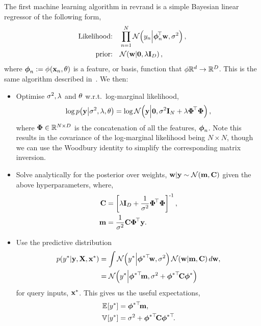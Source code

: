 \documentclass[11pt, oneside]{article}
\begin{document}
The first machine learning algorithm in revrand is a simple Bayesian linear
regressor of the following form,
\begin{align}
    \text{Likelihood:} \quad &\prod^N_{n=1} 
    \gausC{\targs_n}{\feats_n\T\weights, \var}, \\
    \text{prior:} \quad &\gausC{\weights}{\mathbf{0}, \reg\ident{D}},
\end{align}
where $\feats_n := \func{\featsym}{\inss_n, \param}{}$ is a feature, or basis,
function that $\featsym \real{d} \to \real{D}$. This is the same algorithm
described in~\cite[Chapter 2]{Rasmussen2006}. We then:
\begin{itemize}
    \item Optimise $\var, \reg$ and $\param$ w.r.t.\ log-marginal likelihood,
        \begin{equation}
            \log \probC{\targ}{\var, \reg, \param} =
            \log \gausC{\targ}{\mathbf{0}, \var\ident{N} + \reg \feat\T\feat},
        \end{equation}
        where $\feat \in \real{N \times D}$ is the concatenation of all the
        features, $\feats_n$. Note this results in the covariance of the
        log-marginal likelihood being $N \times N$, though we can use the
        Woodbury identity to simplify the corresponding matrix inversion.
    \item Solve analytically for the posterior over weights, $\weights | \targ
        \sim \gaus{\pomean, \pocov}$ given the above hyperparameters, where,
        \begin{align*}
            \pocov &= \sbrac{\reg \ident{D} + \frac{1}{\var}
                \feat\T \feat}\inv, \\
            \pomean &= \frac{1}{\var} \pocov \feat\T \targ.
        \end{align*}
    \item Use the predictive distribution
        \begin{align}
            \probC{\targs\test}{\targ, \ins, \inss\test} &= \int
            \gausC{\targs\test}{\feats\testT\weights, \var}
            \gausC{\weights}{\pomean, \pocov} d\weights, \nonumber \\
            &= \gausC{\targs\test}{\feats\testT \pomean,
                \var + \feats\testT \pocov \feats\test}
        \end{align}
        for query inputs, $\inss\test$. This gives us the useful expectations,
        \begin{align}
            \expece{}{\targs\test} &= \feats\testT\pomean, \\
            \evar{}{\targs\test} &= \var + \feats\testT\pocov\feats\testT.
        \end{align}
\end{itemize}
\end{document}
